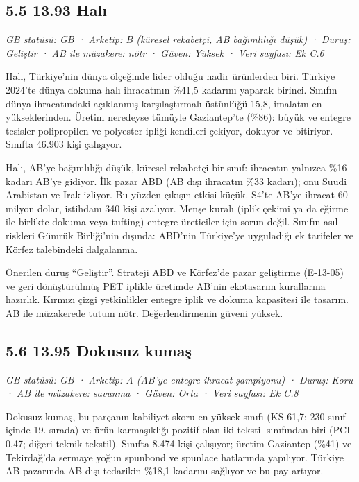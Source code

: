 \hypertarget{nace_kartlar_13-15-55-1393-halux131}{%
\subsection{5.5 13.93 Halı}\label{nace_kartlar_13-15-55-1393-halux131}}

\emph{GB statüsü: GB · Arketip: B (küresel rekabetçi, AB bağımlılığı düşük) · Duruş: Geliştir · AB ile müzakere: nötr · Güven: Yüksek · Veri sayfası: Ek C.6}

Halı, Türkiye'nin dünya ölçeğinde lider olduğu nadir ürünlerden biri. Türkiye 2024'te dünya dokuma halı ihracatının \%41,5 kadarını yaparak birinci. Sınıfın dünya ihracatındaki açıklanmış karşılaştırmalı üstünlüğü 15,8, imalatın en yükseklerinden. Üretim neredeyse tümüyle Gaziantep'te (\%86): büyük ve entegre tesisler polipropilen ve polyester ipliği kendileri çekiyor, dokuyor ve bitiriyor. Sınıfta 46.903 kişi çalışıyor.

Halı, AB'ye bağımlılığı düşük, küresel rekabetçi bir sınıf: ihracatın yalnızca \%16 kadarı AB'ye gidiyor. İlk pazar ABD (AB dışı ihracatın \%33 kadarı); onu Suudi Arabistan ve Irak izliyor. Bu yüzden çıkışın etkisi küçük. S4'te AB'ye ihracat 60 milyon dolar, istihdam 340 kişi azalıyor. Menşe kuralı (iplik çekimi ya da eğirme ile birlikte dokuma veya tufting) entegre üreticiler için sorun değil. Sınıfın asıl riskleri Gümrük Birliği'nin dışında: ABD'nin Türkiye'ye uyguladığı ek tarifeler \etiketD{} ve Körfez talebindeki dalgalanma.

Önerilen duruş ``Geliştir''. Strateji ABD ve Körfez'de pazar geliştirme (E-13-05) ve geri dönüştürülmüş PET iplikle üretimde AB'nin ekotasarım kurallarına hazırlık. Kırmızı çizgi yetkinlikler entegre iplik ve dokuma kapasitesi ile tasarım. AB ile müzakerede tutum nötr. Değerlendirmenin güveni yüksek.

\hypertarget{nace_kartlar_13-15-56-1395-dokusuz-kumaux15f}{%
\subsection{5.6 13.95 Dokusuz kumaş}\label{nace_kartlar_13-15-56-1395-dokusuz-kumaux15f}}

\emph{GB statüsü: GB · Arketip: A (AB'ye entegre ihracat şampiyonu) · Duruş: Koru · AB ile müzakere: savunma · Güven: Orta · Veri sayfası: Ek C.8}

Dokusuz kumaş, bu parçanın kabiliyet skoru en yüksek sınıfı (KS 61,7; 230 sınıf içinde 19. sırada) ve ürün karmaşıklığı pozitif olan iki tekstil sınıfından biri (PCI 0,47; diğeri teknik tekstil). Sınıfta 8.474 kişi çalışıyor; üretim Gaziantep (\%41) ve Tekirdağ'da sermaye yoğun spunbond ve spunlace hatlarında yapılıyor. Türkiye AB pazarında AB dışı tedarikin \%18,1 kadarını sağlıyor ve bu pay artıyor.

